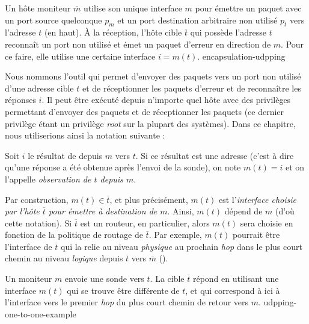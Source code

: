  {Un
hôte moniteur $\overline{m}$ utilise son unique interface $m$ pour émettre un paquet \udp avec un port source
quelconque $p_m$ et un port destination arbitraire non utilisé $p_t$ vers
l'adresse \ip $t$ (en haut). À la réception, l'hôte cible $\overline{t}$ qui
possède l'adresse \ip $t$ reconnaît un port non utilisé et émet un paquet \icmp
d'erreur en direction de $m$. Pour ce faire, elle utilise une certaine interface
$i = m(t)$.} {encapsulation-udpping}

Nous nommons \udpping l'outil qui permet d'envoyer des paquets \udp vers un port
non utilisé d'une adresse cible $t$ et de réceptionner les paquets d'erreur
\icmp et de reconnaître les réponses $i$. Il peut être exécuté depuis
n'importe quel hôte avec des privilèges permettant d'envoyer des paquets \udp et
de réceptionner les paquets \icmp (ce dernier privilège étant un privilège {\em
root} sur la plupart des systèmes). Dans ce chapitre, nous utiliserions ainsi la
notation suivante :

\begin{definition} Soit $i$ le
résultat de \udpping depuis $m$ vers $t$. Si ce résultat est une adresse (c'est
à dire qu'une réponse a été obtenue après l'envoi de la sonde), on note $m(t) =
i$ et on l'appelle {\em observation de $t$ depuis $m$}.
\label{def:udpping-one-to-one}
\end{definition}

Par construction, $m(t) \in \overline{t}$, et plus précisément, $m(t)$ est
l'{\em interface choisie par l'hôte $\overline{t}$ pour émettre à destination de
$m$}. Ainsi, $m(t)$ dépend de $m$ (d'où cette notation).
Si $\overline{t}$ est un routeur, en particulier, alors $m(t)$ sera choisie en
fonction de la politique de routage de $\overline{t}$. Par exemple, $m(t)$
pourrait être l'interface de $\overline{t}$ qui la relie au niveau {\em
physique} au prochain {\em hop} dans le plus court chemin au niveau {\em
logique} depuis $\overline{t}$ vers $\overline{m}$
().

 {Un moniteur $m$ envoie une sonde \udpping vers $t$. La
cible $\overline{t}$ répond en utilisant une interface $m(t)$ qui se trouve être
différente de $t$, et qui correspond à ici à l'interface vers le premier {\em
hop} du plus court chemin de retour vers $m$.} {udpping-one-to-one-example}

